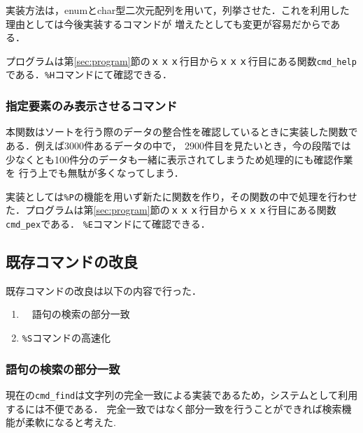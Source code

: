 \documentclass[a4j,11pt]{jarticle}
\begin{document}
実装方法は，enumとchar型二次元配列を用いて，列挙させた．これを利用した理由としては今後実装するコマンドが
増えたとしても変更が容易だからである．

プログラムは第\ref{sec:program}節のｘｘｘ行目からｘｘｘ行目にある関数\verb|cmd_help|である．\verb|%H|コマンドにて確認できる．
\subsubsection{指定要素のみ表示させるコマンド}\label{sec:printyouso}
本関数はソートを行う際のデータの整合性を確認しているときに実装した関数である．例えば3000件あるデータの中で，
2900件目を見たいとき，今の段階では少なくとも100件分のデータも一緒に表示されてしまうため処理的にも確認作業を
行う上でも無駄が多くなってしまう．

実装としては\verb|%P|の機能を用いず新たに関数を作り，その関数の中で処理を行わせた．プログラムは第\ref{sec:program}節のｘｘｘ行目からｘｘｘ行目にある関数\verb|cmd_pex|である．
\verb|%E|コマンドにて確認できる．
\subsection{既存コマンドの改良}\label{sec:kison}
既存コマンドの改良は以下の内容で行った．
\begin{enumerate}
\setlength{\parskip}{2pt} \setlength{\itemsep}{2pt}
    \item　語句の検索の部分一致
    \item \verb|%S|コマンドの高速化
\end{enumerate}
\subsubsection{語句の検索の部分一致}
現在の\verb|cmd_find|は文字列の完全一致による実装であるため，システムとして利用するには不便である．
完全一致ではなく部分一致を行うことができれば検索機能が柔軟になると考えた.
\end{document}
